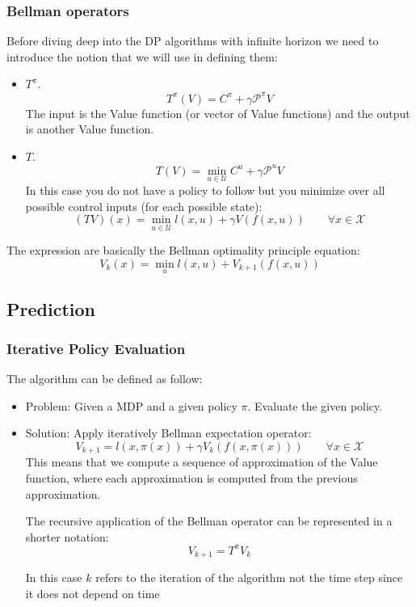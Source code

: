 \subsubsection{Bellman operators}
Before diving deep into the DP algorithms with infinite horizon we need to introduce the notion that we will use in defining them:
\begin{itemize}
\item {} $T^{\pi}$.
\[T^{\pi}(V) = C^{\pi} + \gamma\mathcal{P}^{\pi}V\]
The input is the Value function (or vector of Value functions) and the output is another Value function.
\item {} $T$.
\[T(V) = \min_{u\in\mathcal{U}} C^u + \gamma\mathcal{P}^uV\]
In this case you do not have a policy to follow but you minimize over all possible control inputs (for each possible state):
\[(TV)(x) = \min_{u\in\mathcal{U}} l(x,u) + \gamma V(f(x,u))\qquad\forall x \in \mathcal{X}\]
\end{itemize}

The expression are basically the Bellman optimality principle equation:
\[V_k(x) = \min_{u} l(x,u) + V_{k+1}(f(x,u))\]

\subsection{Prediction}
\subsubsection{Iterative Policy Evaluation}
The  algorithm can be defined as follow:
\begin{itemize}
\item Problem: Given a MDP and a given policy $\pi$. Evaluate the given policy.
\item Solution: Apply iteratively Bellman expectation operator:
\[V_{k+1} = l(x,\pi(x)) + \gamma V_{k}(f(x,\pi(x)))\qquad \forall x \in \mathcal{X}\]
This means that we compute a sequence of approximation of the Value function, where each approximation is computed from the previous approximation.

The recursive application of the Bellman operator can be represented in a shorter notation:
\[V_{k+1} = T^{\pi}V_k\]

In this case $k$ refers to the iteration of the algorithm not the time step since it does not depend on time
\end{itemize}


